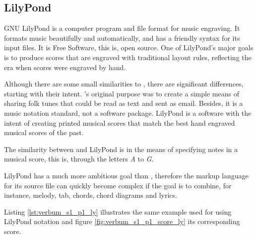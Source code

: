 \subsection{LilyPond}

GNU LilyPond\cite{lilypond:Online} is a computer program and file format for music engraving. It
formats music beautifully and automatically, and has a friendly syntax for its input files. It is
Free Software, this is, open source. One of LilyPond's major goals is to produce scores that are
engraved with traditional layout rules, reflecting the era when scores were engraved by hand.

Although there are some small similarities to \abc{}, there are significant differences, starting
with their intent. \abc{}'s original purpose was to create a simple means of sharing folk tunes that
could be read as text and sent as email. Besides, it is a music notation standard, not a software
package. LilyPond is a software with the intent of creating printed musical scores that match the
best hand engraved musical scores of the past.

The similarity between \abc{} and LilyPond is in the means of specifying notes in a musical score,
this is, through the letters \emph{A} to \emph{G}.

LilyPond has a much more ambitious goal than \abc{}, therefore the markup language for its source
file can quickly become complex if the goal is to combine, for instance, melody, tab, chords, chord
diagrams and lyrics.

Listing \ref{lst:verbum_s1_p1_ly} illustrates the same example used for \abc{} using LilyPond
notation and figure \ref{fig:verbum_s1_p1_score_ly} its corresponding score.\\



